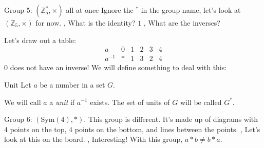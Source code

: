 \begin{namedframe}{Group 5: $(\mathbb{Z}_{5}^*, \times)$ all at once}
	Ignore the $^*$ in the group name, let's look at $(\mathbb{Z}_{5}, \times)$ for now.
	\sep
	What is the identity? \pause $1$
	\sep
	What are the inverses?

	Let's draw out a table:
	\begin{equation*}
		\begin{array}{c|ccccc}
			a      & 0 & 1  & 2 & 3 & 4\\\hline
			a^{-1} & * & 1  & 3 & 2 & 4
		\end{array}
	\end{equation*}
	$0$ does not have an inverse! We will define something to deal with this:
	\begin{block}{Unit}
		Let $a$ be a number in a set $G$.

		We will call $a$ a \emph{unit} if $a^{-1}$ exists. The set of units of $G$ will be called $G^*$.
	\end{block}
\end{namedframe}
\begin{namedframe}{Group 6: $(\mathrm{Sym}(4), *)$.}
	This group is different. It's made up of diagrams with 4 points on the top, 4 points on the bottom, and lines between the points.
	\sep
	Let's look at this on the board.
	\sep
	Interesting! With this group, $a * b \neq b * a$.
\end{namedframe}
